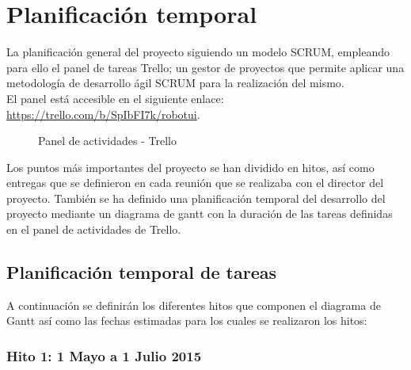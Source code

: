 \chapter{Planificación temporal}
\label{chap:planificacion}

La planificación general del proyecto siguiendo un modelo SCRUM, empleando para ello el panel de tareas Trello; un gestor de proyectos que permite aplicar una metodología de desarrollo ágil SCRUM para la realización del mismo.\\

El panel está accesible en el siguiente enlace: \url{https://trello.com/b/SpIbFI7k/robotui}.

\begin{figure}[H]
\caption{Panel de actividades - Trello}
\end{figure}

Los puntos más importantes del proyecto se han dividido en hitos, así como entregas que se definieron en cada reunión que se realizaba con el director del proyecto. También se ha definido una planificación temporal del desarrollo del proyecto mediante un diagrama de gantt con la duración de las tareas definidas en el panel de actividades de Trello.\\
\newpage


\section{Planificación temporal de tareas}

A continuación se definirán los diferentes hitos que componen el diagrama de Gantt así como las fechas estimadas para los cuales se realizaron los hitos:
\subsection{Hito 1: 1 Mayo a 1 Julio 2015}
\label{subsec:hito1}

